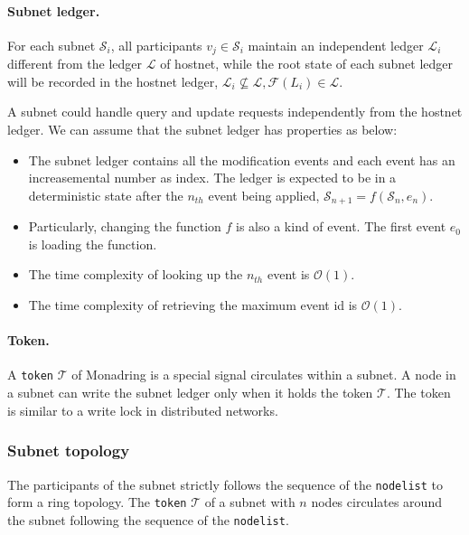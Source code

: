 \documentclass[11pt]{article}
\begin{document}
\paragraph{Subnet ledger.}
For each subnet $\mathcal{S}_{i}$, all participants \(v_{j} \in \mathcal{S}_{i}\) maintain an independent ledger $\mathcal{L}_{i}$ different from the ledger $\mathcal{L}$ of hostnet, while the root state of each subnet ledger will be recorded in the hostnet ledger, \( \mathcal{L}_{i} \nsubseteq \mathcal{L}, \mathcal{F}(L_{i}) \in \mathcal{L} \).

A subnet could handle query and update requests independently from the hostnet ledger.
We can assume that the subnet ledger has properties as below:

\begin{itemize}
\item The subnet ledger contains all the modification events and each event has an increasemental number as index.
The ledger is expected to be in a deterministic state after the $n_{th}$ event being applied, \(\mathcal{S}_{n+1} = f(\mathcal{S}_{n}, e_{n})\).
\item Particularly, changing the function $f$ is also a kind of event. The first event $e_{0}$ is loading the function.
\item The time complexity of looking up the $n_{th}$ event is $\mathcal{O}(1)$.
\item The time complexity of retrieving the maximum event id is $\mathcal{O}(1)$.
\end{itemize}

\paragraph{Token.} A \texttt{token} $\mathcal{T}$ of Monadring is a special signal circulates within a subnet.
A node in a subnet can write the subnet ledger only when it holds the token $\mathcal{T}$. The token is similar to a write lock in distributed networks.

\subsubsection{Subnet topology}
The participants of the subnet strictly follows the sequence of the \texttt{nodelist} to form a ring topology.
The \texttt{token} $\mathcal{T}$ of a subnet with $n$ nodes circulates around the subnet following the sequence of the \texttt{nodelist}.
\end{document}
